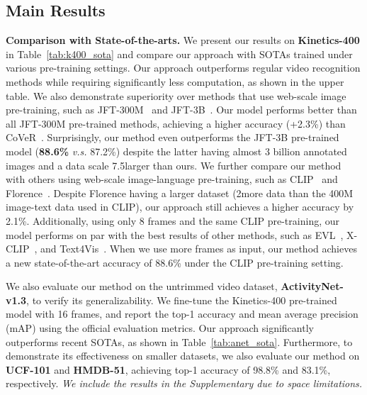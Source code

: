\documentclass[10pt,twocolumn,letterpaper]{article}
\def\x{}
\begin{document}
\subsection{Main Results}\label{sec:sota}
\noindent\textbf{Comparison with State-of-the-arts.}
We present our results on \textbf{Kinetics-400} in Table~\ref{tab:k400_sota} and compare our approach with SOTAs trained under various pre-training settings. 
Our approach outperforms regular video recognition methods while requiring significantly less computation, as shown in the upper table. 
We also demonstrate superiority over methods that use web-scale image pre-training, such as JFT-300M~\cite{JFT300M} and JFT-3B~\cite{JFT3B}. Our model performs better than all JFT-300M pre-trained methods, achieving a higher accuracy (+2.3\%) than CoVeR~\cite{cover}.
Surprisingly, our method even outperforms the JFT-3B pre-trained model (\textbf{88.6\%} \emph{v.s.} 87.2\%) despite the latter having almost 3 billion annotated images and a data scale 7.5\x larger than ours.
We further compare our method with others using web-scale image-language pre-training, such as CLIP~\cite{CLIP} and Florence~\cite{yuan2021florence}. Despite Florence having a larger dataset (2\x more data than the 400M image-text data used in CLIP), our approach still achieves a higher accuracy by 2.1\%.
Additionally, using only 8 frames and the same CLIP pre-training, our model performs on par with the best results of other methods, such as EVL~\cite{evl}, X-CLIP~\cite{x-clip}, and Text4Vis~\cite{text4vis}. 
When we use more frames as input, our method achieves a new state-of-the-art accuracy of 88.6\% under the CLIP pre-training setting.

We also evaluate our method on the untrimmed video dataset, \textbf{ActivityNet-v1.3}, to verify its generalizability. We fine-tune the Kinetics-400 pre-trained model with 16 frames, and report the top-1 accuracy and mean average precision (mAP) using the official evaluation metrics. Our approach significantly outperforms recent SOTAs, as shown in Table~\ref{tab:anet_sota}.
Furthermore, to demonstrate its effectiveness on smaller datasets, we also evaluate our method on \textbf{UCF-101} and \textbf{HMDB-51}, achieving top-1 accuracy of 98.8\% and 83.1\%, respectively. 
\emph{We include the results in the Supplementary due to space limitations.}
\end{document}
